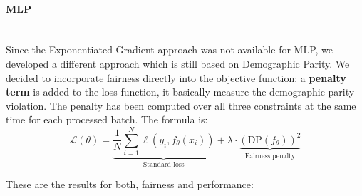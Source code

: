 \documentclass{article}
\begin{document}
\paragraph{MLP}\mbox{}\\
Since the Exponentiated Gradient approach was not available for MLP, we developed a different approach which is still based on Demographic Parity. We decided to incorporate fairness directly into the objective function: a \textbf{penalty term} is added to the loss function, it basically measure the demographic parity violation. The penalty has been computed over all three constraints at the same time for each processed batch. The formula is:
\begin{equation}
\mathcal{L}(\theta) = \underbrace{\frac{1}{N}\sum_{i=1}^N \ell(y_i, f_\theta(x_i))}_{\text{Standard loss}} + \lambda \cdot \underbrace{\left(\text{DP}(f_\theta)\right)^2}_{\text{Fairness penalty}}
\end{equation}

These are the results for both, fairness and performance:
\end{document}
